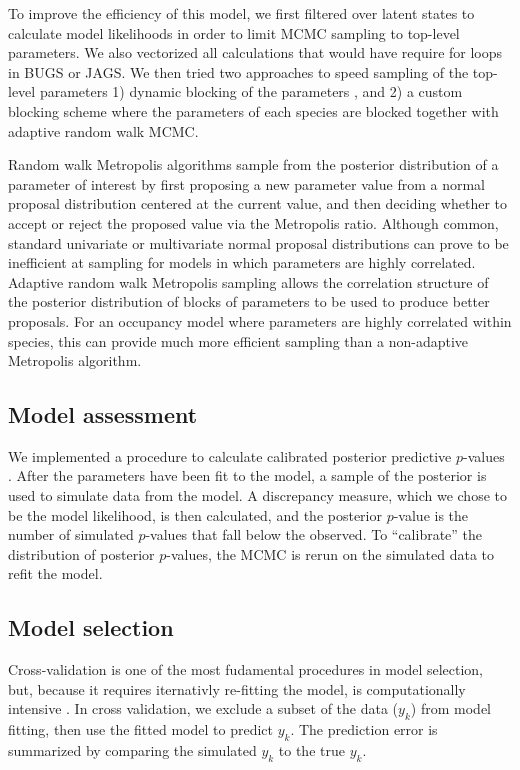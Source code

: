 \documentclass[12pt]{article}
\begin{document}
To improve the efficiency of this model, we first filtered over latent
states to calculate model likelihoods in order to limit MCMC sampling
to top-level parameters. We also vectorized all calculations that
would have require for loops in BUGS or JAGS. We then tried two
approaches to speed sampling of the top-level parameters 1) dynamic
blocking of the parameters \citep{turek2016efficient}, and 2) a custom
blocking scheme where the parameters of each species are blocked
together with adaptive random walk MCMC.

Random walk Metropolis algorithms \citep{metropolis1953equation} sample from the posterior distribution of a parameter of interest by first proposing a new parameter value from a normal proposal distribution centered at the current value, and then deciding whether to accept or reject the proposed value via the Metropolis ratio.  Although common, standard univariate or multivariate normal proposal distributions can prove to be inefficient at sampling for models in which parameters are highly correlated.   Adaptive random walk Metropolis sampling \citep{haario98anadaptive} allows the correlation structure of the posterior distribution of blocks of parameters to be used to produce better proposals.  For an occupancy model where parameters are highly correlated within species, this can provide much more efficient sampling than a non-adaptive Metropolis algorithm.   


\subsection*{Model assessment}
\label{sec:assess}

We implemented a procedure to calculate calibrated posterior
predictive $p$-values \citep{hjort-etal-06}. After the parameters have
been fit to the model, a sample of the posterior is used to simulate
data from the model. A discrepancy measure, which we chose to be the
model likelihood, is then calculated, and the posterior $p$-value is
the number of simulated $p$-values that fall below the observed. To
``calibrate'' the distribution of posterior $p$-values, the MCMC is
rerun on the simulated data to refit the model. 

\subsection*{Model selection}
\label{sec:select}

Cross-validation is one of the most fudamental procedures in model
selection, but, because it requires iternativly re-fitting the model,
is computationally intensive \citep{hooten2014guide}. In cross
validation, we exclude a subset of the data ($y_k$) from model
fitting, then use the fitted model to predict $y_k$. The prediction
error is summarized by comparing the simulated $y_k$ to the true $y_k$.
\end{document}
